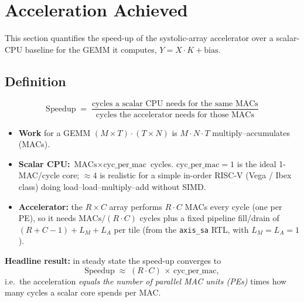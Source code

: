 
\section{Acceleration Achieved}

This section quantifies the speed-up of the systolic-array accelerator over a
scalar-CPU baseline for the GEMM it computes, $Y = X\cdot K + \text{bias}$.

\subsection{Definition}

\begin{equation*}
  \text{Speedup} \;=\;
  \frac{\text{cycles a scalar CPU needs for the same MACs}}
       {\text{cycles the accelerator needs for those MACs}}
\end{equation*}

\begin{itemize}
  \item \textbf{Work} for a GEMM $(M\times T)\cdot(T\times N)$ is
        $M\cdot N\cdot T$ multiply--accumulates (MACs).
  \item \textbf{Scalar CPU:} $\text{MACs}\times \text{cyc\_per\_mac}$ cycles.
        $\text{cyc\_per\_mac}=1$ is the ideal 1-MAC/cycle core; $\approx 4$ is
        realistic for a simple in-order RISC-V (Vega / Ibex class) doing
        load--load--multiply--add without SIMD.
  \item \textbf{Accelerator:} the $R\times C$ array performs $R\cdot C$ MACs
        every cycle (one per PE), so it needs $\text{MACs}/(R\cdot C)$ cycles
        plus a fixed pipeline fill/drain of $(R+C-1)+L_M+L_A$ per tile (from the
        \texttt{axis\_sa} RTL, with $L_M=L_A=1$).
\end{itemize}

\noindent\textbf{Headline result:} in steady state the speed-up converges to
\begin{equation}
  \text{Speedup} \;\approx\; (R\cdot C)\,\times\,\text{cyc\_per\_mac},
\end{equation}
i.e.\ the acceleration \emph{equals the number of parallel MAC units (PEs)}
times how many cycles a scalar core spends per MAC.

